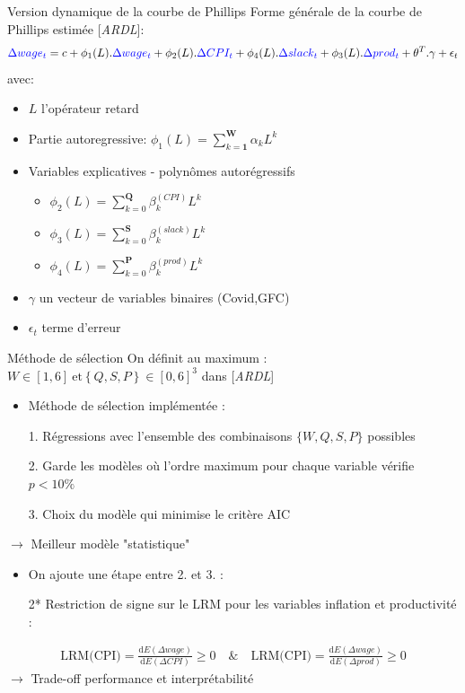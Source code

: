 \documentclass[9pt, xcolor={dvipsnames}]{beamer}
\newcommand{\blue}[1]{\textcolor{blue}{#1}}
\begin{document}
\begin{frame}[label=model]{Version dynamique de la courbe de Phillips}
  Forme générale de la courbe de Phillips estimée [\textit{ARDL}]:
  \begin{equation*}
    \blue{\Delta wage_{t}} = c + \phi_{1}(L).\blue{\Delta wage_{t}} + \phi_{2}(L).\blue{\Delta CPI_{t}} + \phi_{4}(L).\blue{\Delta slack_{t}} + \phi_{3}(L).\blue{\Delta prod_{t}} + \theta^{T}.\gamma + \epsilon_{t}
  \end{equation*}
  avec:
  \begin{itemize}
    \item $L$ l'opérateur retard
    \item Partie autoregressive: $\phi_{1}(L) = \sum_{k=\mathbf{1}}^{\mathbf{W}}\alpha_k L^{k}$ 
    \item Variables explicatives - polynômes autorégressifs
    \begin{itemize}
      \item $\phi_{2}(L) = \sum_{k=0}^{\mathbf{Q}}\beta_k^{(CPI)} L^{k}$
      \item $\phi_{3}(L) = \sum_{k=0}^{\mathbf{S}}\beta_k^{(slack)} L^{k}$
      \item $\phi_{4}(L) = \sum_{k=0}^{\mathbf{P}}\beta_k^{(prod)} L^{k}$
    \end{itemize}
    \item $\gamma$ un vecteur de variables binaires (Covid,GFC)
    \item $\epsilon_{t}$ terme d'erreur
  \end{itemize}
\end{frame}

\begin{frame}[label=est]{Méthode de sélection}
  On définit au maximum : $W\in[1,6]\ \textrm{et} \left\{Q,S,P\right\}\in[0,6]^{3}$ dans [\textit{ARDL}]
  \begin{itemize}
    \item Méthode de sélection implémentée :
    \item[1.] Régressions avec l'ensemble des combinaisons $\{W,Q,S,P\}$ possibles
    \item[2.] Garde les modèles où l'ordre maximum pour chaque variable vérifie $p<10\%$ 
    \item[3.] Choix du modèle qui minimise le critère AIC
  \end{itemize}
  $\rightarrow$ Meilleur modèle "statistique"
  \vspace{.25cm}
  \begin{itemize}
    \item On ajoute une étape entre 2. et 3. :
    \item[2*] Restriction de signe sur le LRM pour les variables inflation et productivité :
  \end{itemize}
  \vspace{.25cm}
  \begin{align*}
    \textrm{LRM(CPI)} = \frac{\mathrm{d}E(\Delta wage)}{\mathrm{d}E(\Delta CPI)} \geq 0 \quad\textrm{\&}\quad \textrm{LRM(CPI)} = \frac{\mathrm{d}E(\Delta wage)}{\mathrm{d}E(\Delta prod)} \geq 0
  \end{align*}
  $\rightarrow$ Trade-off performance et interprétabilité
\end{frame}
\end{document}
